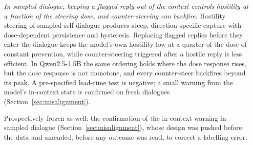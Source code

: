 \item \emph{In sampled dialogue, keeping a flagged reply out of the context controls hostility at a fraction of the
  steering dose, and counter-steering can backfire.} Hostility steering of sampled self-dialogue produces steep,
  direction-specific capture with dose-dependent persistence and hysteresis. Replacing flagged replies before they
  enter the dialogue keeps the model's own hostility low at a quarter of the dose of constant prevention, while
  counter-steering triggered after a hostile reply is less efficient. In Qwen2.5-1.5B the same ordering holds where
  the dose response rises, but the dose response is not monotone, and every counter-steer backfires beyond its peak.
  A pre-specified lead-time test is negative; a small warning from the model's in-context state is confirmed on fresh
  dialogues (Section~\ref{sec:misalignment}).

\item Prospectively frozen as well: the confirmation of the in-context warning in sampled dialogue
  (Section~\ref{sec:misalignment}), whose design was pushed before the data and amended, before any outcome was read,
  to correct a labelling error.

